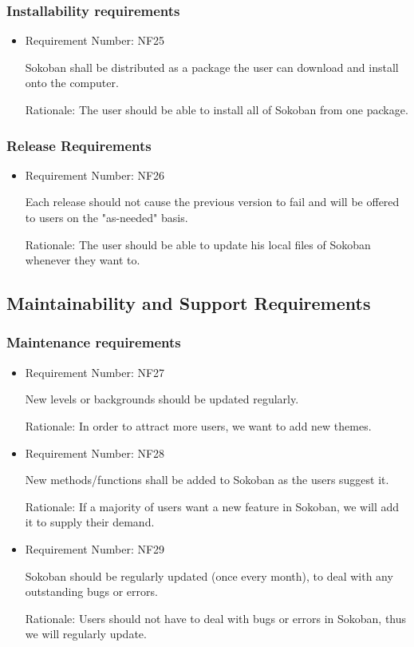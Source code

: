 \documentclass[12pt, titlepage]{article}
\begin{document}
\subsubsection{Installability requirements}

\begin{itemize}
    \item Requirement Number: NF25
    
Sokoban shall be distributed as a package the user can download and install onto the computer.
     
    Rationale: The user should be able to install all of Sokoban from one package.
\end{itemize}

\subsubsection{Release Requirements}

\begin{itemize}
    \item Requirement Number: NF26
    
Each release should not cause the previous version to fail and will be offered to users on the "as-needed" basis. 
     
    Rationale: The user should be able to update his local files of Sokoban whenever they want to.
\end{itemize}

\subsection{Maintainability and Support Requirements}
\subsubsection{Maintenance requirements}

\begin{itemize}
    \item Requirement Number: NF27
    
New levels or backgrounds should be updated regularly.
     
    Rationale: In order to attract more users, we want to add new themes.
   \item Requirement Number: NF28
    
New methods/functions shall be added to Sokoban as the users suggest it.
     
    Rationale: If a majority of users want a new feature in Sokoban, we will add it to supply their demand. 
    
    \item Requirement Number: NF29
    
Sokoban should be regularly updated (once every month), to deal with any outstanding bugs or errors.
     
    Rationale: Users should not have to deal with bugs or errors in Sokoban, thus we will regularly update.
    
\end{itemize}
\end{document}
